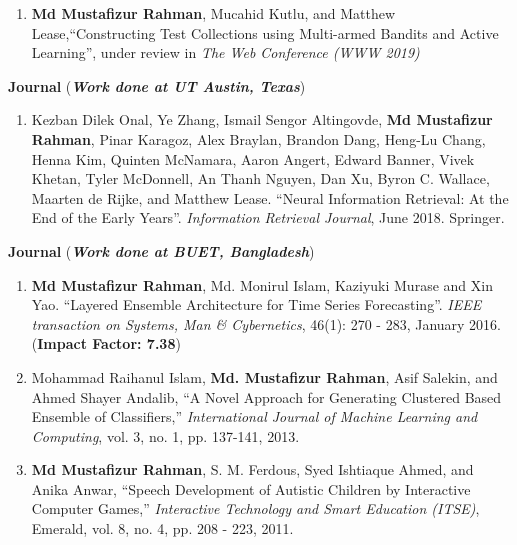 \documentclass[11pt]{res}
\begin{document}
\begin{resume}
\begin{enumerate}
\item \textbf{Md Mustafizur Rahman}, Mucahid Kutlu, and Matthew Lease,``Constructing Test Collections using Multi-armed Bandits and Active Learning'', under review in {\it The Web Conference (WWW 2019)}  

\end{enumerate}


{\large \bf Journal}  ({\sl \textbf{Work done at UT Austin, Texas}})
\begin{enumerate} \itemsep -2pt

 \item Kezban Dilek Onal, Ye Zhang, Ismail Sengor Altingovde, \textbf{Md Mustafizur Rahman}, Pinar Karagoz, Alex Braylan, Brandon Dang, Heng-Lu Chang, Henna Kim, Quinten McNamara, Aaron Angert, Edward Banner, Vivek Khetan, Tyler McDonnell, An Thanh Nguyen, Dan Xu, Byron C. Wallace, Maarten de Rijke, and Matthew Lease. ``Neural Information Retrieval: At the End of the Early Years''. {\it Information Retrieval Journal}, June 2018. Springer.\\ %
\end{enumerate}


{\large \bf Journal} ({\sl \textbf{Work done at BUET, Bangladesh}})
\begin{enumerate} \itemsep -2pt
 \item {\bf Md Mustafizur Rahman}, Md. Monirul Islam, Kaziyuki Murase and Xin Yao. ``Layered Ensemble Architecture for Time Series Forecasting''. {\it IEEE transaction on Systems, Man & Cybernetics}, 46(1): 270 - 283, January 2016. (\textbf{Impact Factor: 7.38}) %
 
 \item Mohammad Raihanul Islam, {\bf Md. Mustafizur Rahman}, Asif Salekin, and Ahmed Shayer Andalib, ``A Novel Approach for Generating Clustered Based Ensemble of Classifiers,'' {\it International Journal of Machine Learning and Computing}, vol. 3, no. 1, pp. 137-141, 2013. %

 \item {\bf Md Mustafizur Rahman}, S. M. Ferdous, Syed Ishtiaque Ahmed, and Anika Anwar, ``Speech Development of Autistic Children by Interactive Computer Games,'' {\it Interactive Technology and Smart Education (ITSE)}, Emerald, vol. 8, no. 4, pp. 208 - 223, 2011. %


\end{enumerate}
\end{resume}
\end{document}

